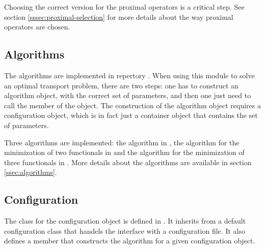         

        Choosing the correct version for the proximal operators is a critical step. See section \ref{sssec:proximal-selection}
        for more details about the way proximal operators are chosen.

    \subsection{Algorithms}
    \noindent

        The algorithms are implemented in repertory . When using this module to solve an 
        optimal transport problem, there are two steps: one has to construct
        an algorithm object, with the correct set of parameters, and then one just need to call the  member of the object.
        The construction of the algorithm object requires a configuration object, which is in fact just a container object
        that contains the set of parameters.

        Three algorithms are implemented: the \pdAlgo{} algorithm in , the \drAlgo{} algorithm for the minimization of two
        functionals in  and the \drAlgo{} algorithm for the minimization of three functionals in .
        More details about the algorithms are available in section \ref{ssec:algorithms}.

    \subsection{Configuration}
    \noindent

        The class for the configuration object is defined in . It inherits from a default
        configuration class that handels the interface with a configuration file.
        It also defines a member  that constructs the algorithm for a given configuration object.

